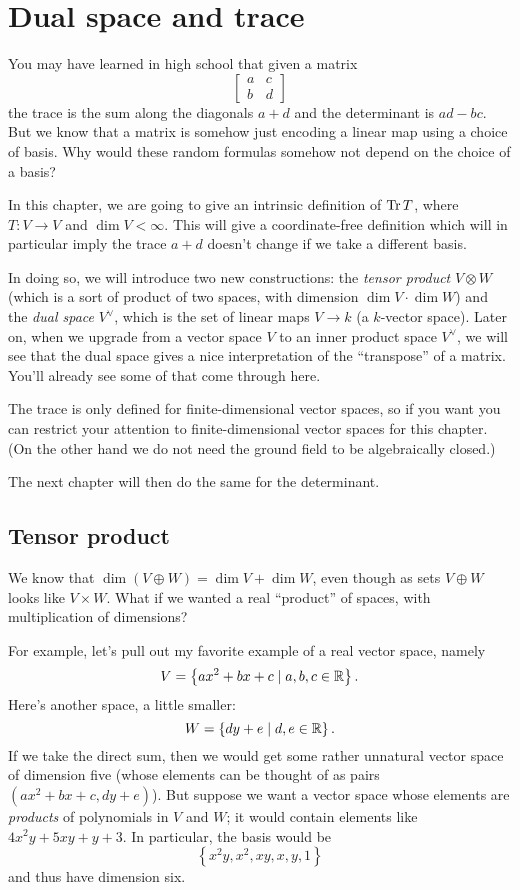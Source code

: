 \chapter{Dual space and trace}
You may have learned in high school that given a matrix
\[
	\begin{bmatrix}
		a & c \\
		b & d
	\end{bmatrix}
\]
the trace is the sum along the diagonals $a+d$
and the determinant is $ad-bc$.
But we know that a matrix is somehow
just encoding a linear map using a choice of basis.
Why would these random formulas somehow not
depend on the choice of a basis?

In this chapter, we are going to
give an intrinsic definition of $\operatorname{Tr} T$,
where $T \colon V \to V$ and $\dim V < \infty$.
This will give a coordinate-free definition
which will in particular imply the trace $a+d$
doesn't change if we take a different basis.

In doing so, we will introduce two new constructions:
the \emph{tensor product} $V \otimes W$
(which is a sort of product of two spaces,
with dimension $\dim V \cdot \dim W$)
and the \emph{dual space} $V^\vee$,
which is the set of linear maps $V \to k$ (a $k$-vector space).
Later on, when we upgrade from a vector space $V$
to an inner product space $V^\vee$,
we will see that the dual space gives a nice
interpretation of the ``transpose'' of a matrix.
You'll already see some of that come through here.

The trace is only defined for finite-dimensional
vector spaces, so if you want you can restrict
your attention to finite-dimensional vector spaces for this chapter.
(On the other hand we do not need the
ground field to be algebraically closed.)

The next chapter will then do the same for the determinant.

\section{Tensor product}
We know that $\dim (V \oplus W) = \dim V + \dim W$,
even though as sets $V \oplus W$ looks like $V \times W$.
What if we wanted a real ``product'' of spaces,
with multiplication of dimensions?

For example, let's pull out
my favorite example of a real vector space, namely
\[ V = \left\{ ax^2 + bx + c \mid a,b,c \in \mathbb R \right\}. \]
Here's another space, a little smaller:
\[ W = \left\{ dy + e \mid d,e \in \mathbb R \right\}. \]
If we take the direct sum, then we would get some rather unnatural
vector space of dimension five
(whose elements can be thought of as pairs $(ax^2+bx+c,dy+e)$).
But suppose we want a vector space
whose elements are \emph{products} of polynomials in $V$ and $W$;
it would contain elements like $4x^2y + 5xy + y + 3$.
In particular, the basis would be
\[ \left\{ x^2y, x^2, xy, x, y, 1 \right\} \]
and thus have dimension six.

